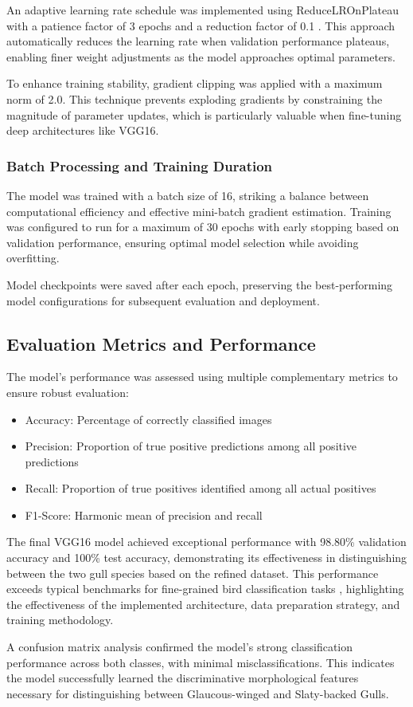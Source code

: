 An adaptive learning rate schedule was implemented using ReduceLROnPlateau with a patience factor of 3 epochs and a reduction factor of 0.1 \citep{wu2015onreducelr}. This approach automatically reduces the learning rate when validation performance plateaus, enabling finer weight adjustments as the model approaches optimal parameters.

To enhance training stability, gradient clipping was applied with a maximum norm of 2.0. This technique prevents exploding gradients by constraining the magnitude of parameter updates, which is particularly valuable when fine-tuning deep architectures like VGG16.

\subsubsection{Batch Processing and Training Duration}

The model was trained with a batch size of 16, striking a balance between computational efficiency and effective mini-batch gradient estimation. Training was configured to run for a maximum of 30 epochs with early stopping based on validation performance, ensuring optimal model selection while avoiding overfitting.

Model checkpoints were saved after each epoch, preserving the best-performing model configurations for subsequent evaluation and deployment.

\subsection{Evaluation Metrics and Performance}

The model's performance was assessed using multiple complementary metrics to ensure robust evaluation:
\begin{itemize}
    \item Accuracy: Percentage of correctly classified images
    \item Precision: Proportion of true positive predictions among all positive predictions
    \item Recall: Proportion of true positives identified among all actual positives
    \item F1-Score: Harmonic mean of precision and recall
\end{itemize}

The final VGG16 model achieved exceptional performance with 98.80\% validation accuracy and 100\% test accuracy, demonstrating its effectiveness in distinguishing between the two gull species based on the refined dataset. This performance exceeds typical benchmarks for fine-grained bird classification tasks \citep{sanchez2019fine}, highlighting the effectiveness of the implemented architecture, data preparation strategy, and training methodology.

A confusion matrix analysis confirmed the model's strong classification performance across both classes, with minimal misclassifications. This indicates the model successfully learned the discriminative morphological features necessary for distinguishing between Glaucous-winged and Slaty-backed Gulls.
